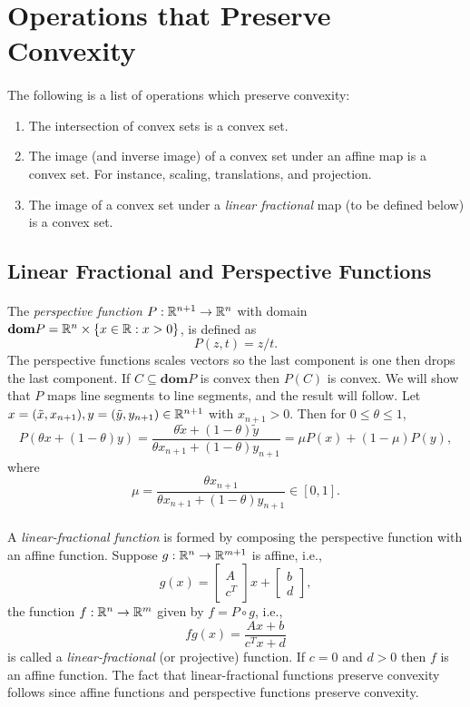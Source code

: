 \documentclass[letterpaper,12pt,oneside,onecolumn]{article}
\begin{document}
\section{Operations that Preserve Convexity}
\paragraph{}
The following is a list of operations which preserve convexity:
\begin{enumerate}
\item The intersection of convex sets is a convex set.
\item The image (and inverse image) of a convex set under an affine map is a convex set. For instance, scaling, translations, and projection.
\item The image of a convex set under a {\it linear fractional } map (to be defined below) is a convex set.
\end{enumerate}
\subsection{Linear Fractional and Perspective Functions}
\paragraph{}
The {\it perspective function} $P: \mathbb{R}^{n+1} \rightarrow \mathbb{R}^n$ with domain $\textbf{dom} P = \mathbb{R}^n \times \{x\in\mathbb{R} : x > 0 \}$, is defined as
$$P(z,t) = z/t.$$
The perspective functions scales vectors so the last component is one then drops the last component. If $C \subseteq \textbf{dom} P$ is convex then $P(C)$ is convex. We will show that $P$ maps line segments to line segments, and the result will follow. Let $x = (\tilde{x}, x_{n+1}), y = (\tilde{y}, y_{n+1}) \in \mathbb{R}^{n+1}$ with $x_{n+1} > 0$. Then for $0 \leq \theta \leq 1$,
$$P(\theta x + (1-\theta)y) = \frac{\theta \tilde{x} + (1-\theta)\tilde{y}}{\theta x_{n+1} + (1-\theta)y_{n+1}} = \mu P(x) + (1-\mu)P(y),$$
where
$$\mu = \frac{\theta x_{n+1}}{\theta x_{n+1} + (1-\theta)y_{n+1}} \in [0,1].$$
\paragraph{}
A {\it linear-fractional function} is formed by composing the perspective function with an affine function. Suppose $g: \mathbb{R}^n \rightarrow \mathbb{R}^{m+1}$ is affine, i.e.,
$$g(x) = \begin{bmatrix}
A \\ c^T
\end{bmatrix} x + \begin{bmatrix}
b \\ d \end{bmatrix},$$
the function $f : \mathbb{R}^n \rightarrow \mathbb{R}^m$ given by $f = P \circ g$, i.e.,
$$fg(x) = \frac{Ax + b}{c^Tx + d}$$
is called a {\it linear-fractional} (or projective) function. If $c = 0$ and $d>0$ then $f$ is an affine function. The fact that linear-fractional functions preserve convexity follows since affine functions and perspective functions preserve convexity.
\end{document}
